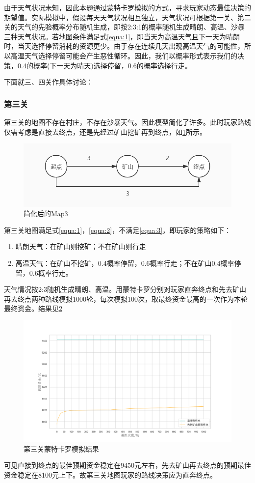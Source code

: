 \documentclass[withoutpre]{cumcmthesis} %
\begin{document}
由于天气状况未知，因此本题通过蒙特卡罗模拟的方式，寻求玩家动态最佳决策的期望值。实际模拟中，假设每天天气状况相互独立，天气状况可根据第一关、第二关的天气的先验概率分布随机生成，即按2:3:1的概率随机生成晴朗、高温、沙暴三种天气状况。若地图条件满足式\cref{equa:1}，即当天为高温天气且下一天为晴朗时，当天选择停留消耗的资源更少。由于存在连续几天出现高温天气的可能性，所以高温天气选择停留可能会产生恶性循环。因此，我们以概率形式表示我们的决策，0.4的概率(下一天为晴天)选择停留，0.6的概率选择行走。

下面就三、四关作具体讨论：
\subsubsection{第三关}
第三关的地图不存在村庄，不存在沙暴天气。因此模型简化了许多。此时玩家路线仅需考虑是直接去终点，还是先经过矿山挖矿再到终点，如\cref{fig:map3}所示。
\begin{figure}[H]
	\centering
	\includegraphics[scale=0.5]{figures/map3.jpg}
	\caption{简化后的Map3}
	\label{fig:map3}
\end{figure}

第三关地图满足式\cref{equa:1}，\cref{equa:2}，不满足\cref{equa:3}，即玩家的策略如下：
\begin{enumerate}
    \item 晴朗天气：在矿山则挖矿；不在矿山则行走
    \item 高温天气：在矿山不挖矿，0.4概率停留，0.6概率行走；不在矿山0.4概率停留，0.6概率行走。
\end{enumerate}

天气情况按2:3随机生成晴朗、高温。用蒙特卡罗分别对玩家直奔终点和先去矿山再去终点两种路线模拟1000轮，每次模拟100次，取最终资金最高的一次作为本轮最终资金。结果见\cref{fig:check3}
\begin{figure}[H]
    \centering
    \includegraphics[scale=0.5]{figures/check3.png}
    \caption{第三关蒙特卡罗模拟结果}
    \label{fig:check3}
\end{figure}
可见直接到终点的最佳预期资金稳定在9450元左右，先去矿山再去终点的预期最佳资金稳定在8100元上下。故第三关地图玩家的路线决策应为直奔终点。
\end{document}
